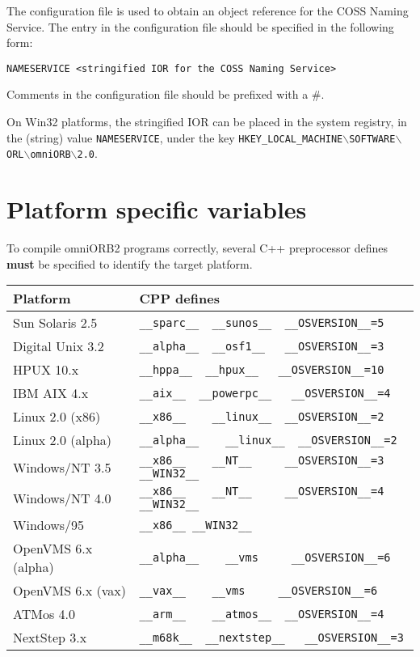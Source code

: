 \documentclass[11pt,twoside,onecolumn]{book}
\begin{document}
The configuration file is used to obtain an object reference for the
COSS Naming Service. The entry in the configuration file should be specified
in the following form:

{\tt NAMESERVICE <stringified IOR for the COSS Naming Service>}

Comments in the configuration file should be prefixed with a \#.

On Win32 platforms, the stringified IOR can be placed in the system registry, 
in the (string) value {\tt NAMESERVICE}, under the key 
{\tt HKEY\_LOCAL\_MACHINE$\backslash$SOFTWARE$\backslash$ORL$\backslash$omniORB$\backslash$2.0}.

\section{Platform specific variables}

To compile omniORB2 programs correctly, several C++ preprocessor defines
{\bf must} be specified to identify the target platform.

\begin{flushleft}
\begin{tabular}{|l|l|}
\hline
Platform & CPP defines \\
\hline
Sun Solaris 2.5  & \verb|__sparc__  __sunos__  __OSVERSION__=5| \\
\hline
Digital Unix 3.2 & \verb|__alpha__  __osf1__   __OSVERSION__=3| \\
\hline
HPUX 10.x & \verb|__hppa__  __hpux__   __OSVERSION__=10| \\
\hline
IBM AIX 4.x & \verb|__aix__  __powerpc__   __OSVERSION__=4| \\
\hline
Linux 2.0 (x86)  & \verb|__x86__    __linux__  __OSVERSION__=2| \\
\hline
Linux 2.0 (alpha)  & \verb|__alpha__    __linux__  __OSVERSION__=2| \\
\hline
Windows/NT 3.5   & \verb|__x86__    __NT__     __OSVERSION__=3  __WIN32__| \\
\hline
Windows/NT 4.0   & \verb|__x86__    __NT__     __OSVERSION__=4  __WIN32__| \\
\hline
Windows/95   & \verb|__x86__ __WIN32__| \\
\hline
OpenVMS 6.x (alpha) & \verb|__alpha__    __vms     __OSVERSION__=6 | \\
\hline
OpenVMS 6.x (vax)   & \verb|__vax__    __vms     __OSVERSION__=6 | \\
\hline
ATMos 4.0        & \verb|__arm__    __atmos__  __OSVERSION__=4| \\
\hline
NextStep 3.x & \verb|__m68k__  __nextstep__   __OSVERSION__=3| \\
\hline
\end{tabular}
\end{flushleft}
\end{document}
